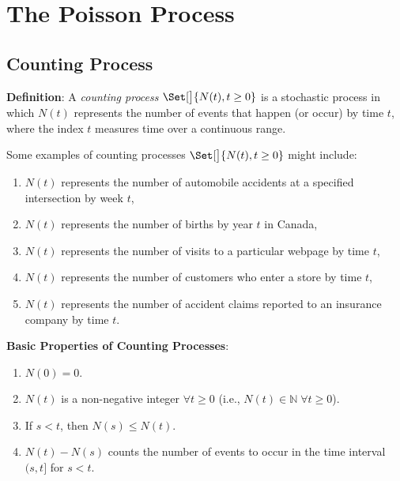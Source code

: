 \section{The Poisson Process}
\subsection*{Counting Process}
\begin{Regular}
    \textbf{Definition}: A \emph{counting process} $ \Set[\big]{N(t),t\ge 0} $ is a stochastic process in which $N(t)$ represents
    the number of events that happen (or occur) by time $t$, where the index $t$ measures time over
    a continuous range.

    Some examples of counting processes $ \Set[\big]{N(t),t\ge 0} $ might include:
    \begin{enumerate}[(1)]
        \item $N(t)$ represents the number of automobile accidents at a specified intersection by week $t$,
        \item $N(t)$ represents the number of births by year $t$ in Canada,
        \item $N(t)$ represents the number of visits to a particular webpage by time $t$,
        \item $N(t)$ represents the number of customers who enter a store by time $t$,
        \item $N(t)$ represents the number of accident claims reported to an insurance company by time
              $t$.
    \end{enumerate}
    \textbf{Basic Properties of Counting Processes}:
    \begin{enumerate}[(1)]
        \item $ N(0)=0 $.
        \item $ N(t) $ is a non-negative integer $ \forall t\ge 0 $ (i.e., $ N(t)\in\mathbb{N}\;\forall t\ge 0 $).
        \item If $ s<t $, then $ N(s)\le N(t) $.
        \item $ N(t)-N(s) $ counts the number of events to occur in the time interval $ (s,t] $ for $ s<t $.
    \end{enumerate}
\end{Regular}
